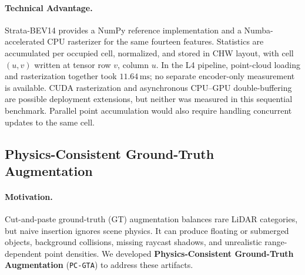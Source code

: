 \paragraph{Technical Advantage.}
Strata-BEV14 provides a NumPy reference implementation and a Numba-accelerated CPU rasterizer for the same fourteen features. Statistics are accumulated per occupied cell, normalized, and stored in CHW layout, with cell $(u,v)$ written at tensor row $v$, column $u$. In the L4 pipeline, point-cloud loading and rasterization together took $11.64\,\text{ms}$; no separate encoder-only measurement is available. CUDA rasterization and asynchronous CPU--GPU double-buffering are possible deployment extensions, but neither was measured in this sequential benchmark. Parallel point accumulation would also require handling concurrent updates to the same cell.

\subsection{Physics-Consistent Ground-Truth Augmentation}
\label{sec:pc_gta}

\paragraph{Motivation.}
Cut-and-paste ground-truth (GT) augmentation balances rare LiDAR categories, but naive insertion ignores scene physics. It can produce floating or submerged objects, background collisions, missing raycast shadows, and unrealistic range-dependent point densities. We developed \textbf{Physics-Consistent Ground-Truth Augmentation} (\texttt{PC-GTA}) to address these artifacts.

